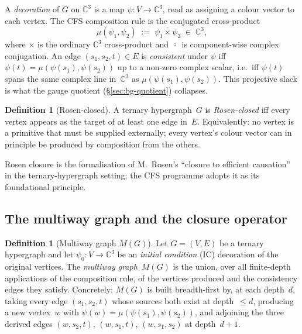 \documentclass[12pt,a4paper]{article}
\theoremstyle{definition}
\newtheorem{definition}[theorem]{Definition}
\theoremstyle{remark}
\newcommand{\bC}{\mathbb{C}}
\begin{document}
A \emph{decoration} of $G$ on $\bC^3$ is a map $\psi : V \to \bC^3$,
read as assigning a colour vector to each vertex. The CFS composition
rule is the conjugated cross-product
\begin{equation}\label{eq:mu}
\mu(\psi_1, \psi_2) \;:=\; \overline{\psi_1 \times \psi_2}
\;\in\; \bC^3,
\end{equation}
where $\times$ is the ordinary $\bC^3$ cross-product and
$\overline{\,\cdot\,}$ is component-wise complex conjugation. An edge
$(s_1, s_2, t) \in E$ is \emph{consistent} under $\psi$ iff
$\psi(t) = \mu(\psi(s_1), \psi(s_2))$ up to a non-zero complex scalar,
i.e.\ iff $\psi(t)$ spans the same complex line in~$\bC^3$ as
$\mu(\psi(s_1), \psi(s_2))$. This projective slack is what the gauge
quotient (\S\ref{sec:bg-quotient}) collapses.

\begin{definition}[Rosen-closed]\label{def:rosen-closed}
A ternary hypergraph~$G$ is \emph{Rosen-closed} iff every vertex
appears as the target of at least one edge in~$E$. Equivalently:
no vertex is a primitive that must be supplied externally; every
vertex's colour vector can in principle be produced by composition
from the others.
\end{definition}

Rosen closure is the formalisation of M.~Rosen's
``closure to efficient causation''~\cite{Rosen1991} in the
ternary-hypergraph setting; the CFS programme adopts it as its
foundational principle.

\subsection{The multiway graph and the closure operator}
\label{sec:bg-multiway}

\begin{definition}[Multiway graph $M(G)$]\label{def:multiway}
Let $G = (V, E)$ be a ternary hypergraph and let $\psi_0 : V \to \bC^3$
be an \emph{initial condition} (IC) decoration of the original
vertices. The \emph{multiway graph}~$M(G)$ is the union, over all
finite-depth applications of the composition rule, of the vertices
produced and the consistency edges they satisfy. Concretely: $M(G)$
is built breadth-first by, at each depth~$d$, taking every edge
$(s_1, s_2, t)$ whose sources both exist at depth~$\le d$, producing
a new vertex~$w$ with $\psi(w) = \mu(\psi(s_1), \psi(s_2))$, and
adjoining the three derived edges $(w, s_2, t)$, $(w, s_1, t)$,
$(w, s_1, s_2)$ at depth~$d+1$.
\end{definition}
\end{document}

